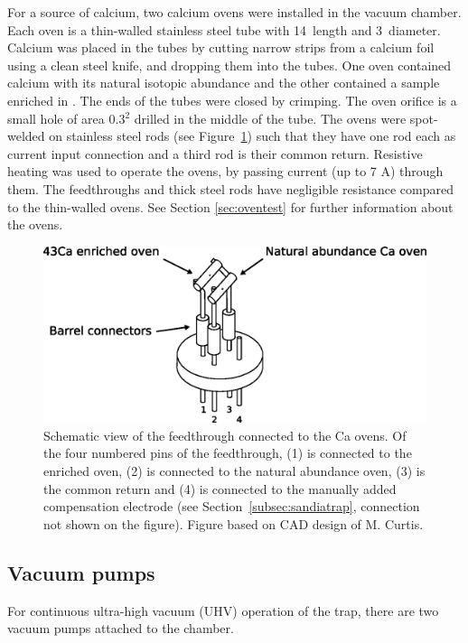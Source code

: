For a source of calcium, two calcium ovens were installed in the vacuum chamber. Each oven is a thin-walled stainless steel tube with 14\mm\, length and 3\mm\, diameter. Calcium was placed in the tubes by cutting narrow strips from a calcium foil using a clean steel knife, and dropping them into the tubes. One oven contained calcium with its natural isotopic abundance  and the other contained a sample enriched in . The ends of the tubes were closed by crimping. The oven orifice is a small hole of area 0.3\mm$^2$ drilled in the middle of the tube. The ovens were spot-welded on stainless steel rods (see Figure~\ref{fig:calciumoven}) such that they have one rod each as current input connection and a third rod is their common return. Resistive heating was used to operate the ovens, by passing current (up to 7 A) through them. The feedthroughs and thick steel rods have negligible resistance compared to the thin-walled ovens. See Section \ref{sec:oventest} for further information about the ovens.


\begin{figure}[t]
\centering
\includegraphics[width=12cm]{chapter4/oven/oven_scheme3}
\caption[Calcium oven schematics]{Schematic view of the feedthrough connected to the Ca ovens. Of the four numbered pins of the feedthrough, (1) is connected to the  enriched oven, (2) is connected to the natural abundance \CaI{} oven, (3) is the common return and (4) is connected to the manually added compensation electrode (see Section~\ref{subsec:sandiatrap}, connection not shown on the figure). Figure based on CAD design of M. Curtis.}
\label{fig:calciumoven}
\end{figure} 

\subsection{Vacuum pumps}

For continuous ultra-high vacuum (UHV) operation of the trap, there are two vacuum pumps attached to the chamber.

